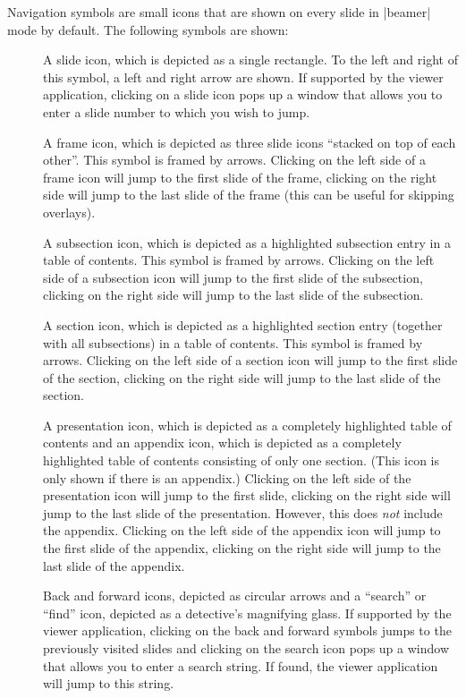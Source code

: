 Navigation symbols are small icons that are shown on every slide in |beamer| mode by default. The following symbols are shown:
\begin{description}
\item[{\makebox[0.7cm][l]{\insertslidenavigationsymbol}}]
  A slide icon, which is depicted as a single rectangle. To the left and right of this symbol, a left and right arrow are shown.\newline
  If supported by the viewer application, clicking on a slide icon pops up a window that allows you to enter a slide number to which you wish to jump.
\item[{\makebox[0.7cm][l]{\insertframenavigationsymbol}}]
  A frame icon, which is depicted as three slide icons ``stacked on top of each other''. This symbol is framed by arrows.\newline
  Clicking on the left side of a frame icon will jump to the first slide of the frame, clicking on the right side will jump to the last slide of the frame (this can be useful for skipping overlays).
\item[{\makebox[0.7cm][l]{\insertsubsectionnavigationsymbol}}]
  A subsection icon, which is depicted as a highlighted subsection entry in a table of contents. This symbol is framed by arrows.\newline
  Clicking on the left side of a subsection icon will jump to the first slide of the subsection, clicking on the right side will jump to the last slide of the subsection.
\item[{\makebox[0.7cm][l]{\insertsectionnavigationsymbol}}]
  A section icon, which is depicted as a highlighted section entry (together with all subsections) in a table of contents. This symbol is framed by arrows.\newline
  Clicking on the left side of a section icon will jump to the first slide of the section, clicking on the right side will jump to the last slide of the section.
\item[{\makebox[0.7cm][l]{\insertdocnavigationsymbol}}]
  A presentation icon, which is depicted as a completely highlighted table of contents and an appendix icon, which is depicted as a completely highlighted table of contents consisting of only one section. (This icon is only shown if there is an appendix.)\newline
  Clicking on the left side of the presentation icon will jump to the first slide, clicking on the right side will jump to the last slide of the presentation. However, this does \emph{not} include the appendix. Clicking on the left side of the appendix icon will jump to the first slide of the appendix, clicking on the right side will jump to the last slide of the appendix.
\item[{\makebox[0.7cm][l]{\insertbackfindforwardnavigationsymbol}}]
  Back and forward icons, depicted as circular arrows and a ``search'' or ``find'' icon, depicted as a detective's magnifying glass.\newline
  If supported by the viewer application, clicking on the back and forward symbols jumps to the previously visited slides and clicking on the search icon pops up a window that allows you to enter a search string. If found, the viewer application will jump to this string.
\end{description}
